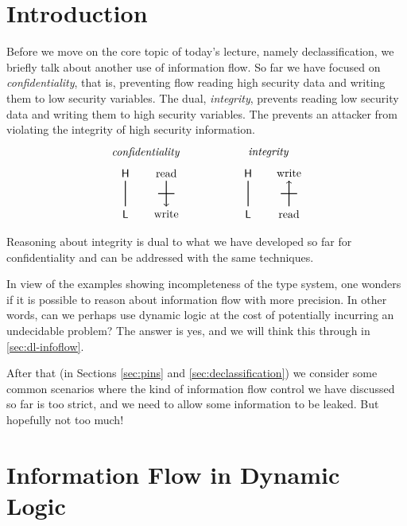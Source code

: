 \documentclass[11pt]{article}
\begin{document}
\maketitle

\section{Introduction}

Before we move on the core topic of today's lecture, namely declassification,
we briefly talk about another use of information flow.  So far we have focused
on \emph{confidentiality}, that is, preventing flow reading high security data
and writing them to low security variables.  The dual, \emph{integrity}, prevents
reading low security data and writing them to high security variables.  The
prevents an attacker from violating the integrity of high security information.
\[
  \begin{tikzpicture}[scale=1.3]
    \node at (0.5,1.5) {\emph{confidentiality}};
    \node (l1) at (0,0) {$\ms{L}$};
    \node (h1) at (0,1) {$\ms{H}$};
    \draw[thick] (h1) -- (l1);
    \node (l2) at (1,0) {write};
    \node (h2) at (1,1) {read};
    \draw[thick,->] (h2) -- (l2);
    \draw[thick] (0.8,0.5) -- (1.2,0.5);
    \node at (3.5,1.5) {\emph{integrity}};
    \node (l3) at (3,0) {$\ms{L}$};
    \node (h3) at (3,1) {$\ms{H}$};
    \draw[thick] (h3) -- (l3);
    \node (l4) at (4,0) {read};
    \node (h4) at (4,1) {write};
    \draw[thick,->] (l4) -- (h4);
    \draw[thick] (3.8,0.5) -- (4.2,0.5);
  \end{tikzpicture}
\]
Reasoning about integrity is dual to what we have developed so far for
confidentiality and can be addressed with the same techniques.

In view of the examples showing incompleteness of the type system, one wonders
if it is possible to reason about information flow with more precision.  In
other words, can we perhaps use dynamic logic at the cost of potentially
incurring an undecidable problem?  The answer is yes, and we will think this
through in \autoref{sec:dl-infoflow}.

After that (in Sections \ref{sec:pins} and \ref{sec:declassification}) we consider some common scenarios
where the kind of information flow control we have discussed so far is too
strict, and we need to allow some information to be leaked.  But hopefully not
too much!

\section{Information Flow in Dynamic Logic}
\label{sec:dl-infoflow}
\end{document}
